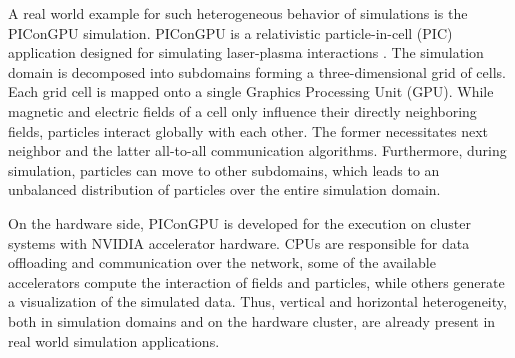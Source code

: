 

\noindent A real world example for such heterogeneous behavior of simulations is
the PIConGPU simulation. PIConGPU is a relativistic particle-in-cell
(PIC) application designed for simulating laser-plasma interactions
\cite{ref:picongpu}. The simulation domain is decomposed into
subdomains forming a three-dimensional grid of cells. Each grid cell
is mapped onto a single Graphics Processing Unit (GPU).  While
magnetic and electric fields of a cell only influence their directly
neighboring fields, particles interact globally with each other. The
former necessitates next neighbor and the latter all-to-all
communication algorithms. Furthermore, during simulation, particles
can move to other subdomains, which leads to an unbalanced
distribution of particles over the entire simulation domain.

On the hardware side, PIConGPU is developed for the execution on
cluster systems with NVIDIA accelerator hardware.  CPUs are
responsible for data offloading and communication over the network,
some of the available accelerators compute the interaction of fields
and particles, while others generate a visualization of the simulated
data. Thus, vertical and horizontal heterogeneity, both in simulation
domains and on the hardware cluster, are already present in real world
simulation applications.

